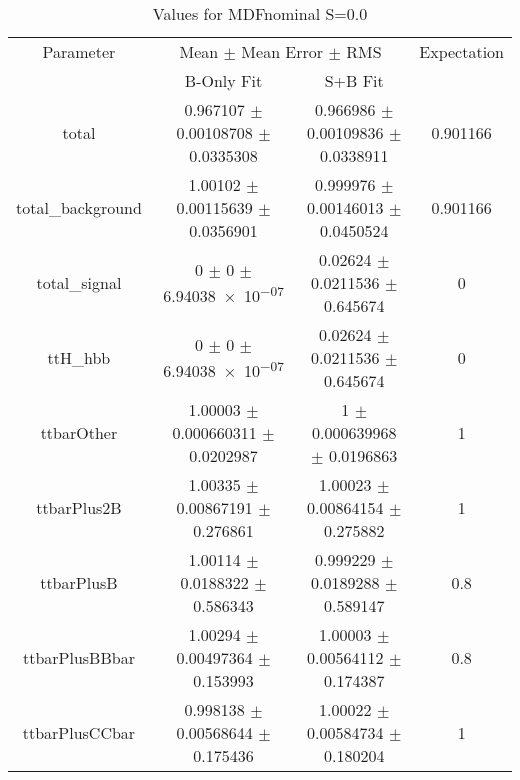 \begin{table}
\centering
\caption{Values for MDFnominal S=0.0}
\begin{tabular}{cccc}
\toprule
Parameter & \multicolumn{2}{c}{Mean $\pm$ Mean Error $\pm$ RMS} & Expectation\\
 & B-Only Fit & S+B Fit & \\
\midrule
total & \num{0.967107} $\pm$ \num{0.00108708} $\pm$ \num{0.0335308} & \num{0.966986} $\pm$ \num{0.00109836} $\pm$ \num{0.0338911} & \num{0.901166}\\
total\_background & \num{1.00102} $\pm$ \num{0.00115639} $\pm$ \num{0.0356901} & \num{0.999976} $\pm$ \num{0.00146013} $\pm$ \num{0.0450524} & \num{0.901166}\\
total\_signal & \num{0} $\pm$ \num{0} $\pm$ \num{6.94038e-07} & \num{0.02624} $\pm$ \num{0.0211536} $\pm$ \num{0.645674} & \num{0}\\
ttH\_hbb & \num{0} $\pm$ \num{0} $\pm$ \num{6.94038e-07} & \num{0.02624} $\pm$ \num{0.0211536} $\pm$ \num{0.645674} & \num{0}\\
ttbarOther & \num{1.00003} $\pm$ \num{0.000660311} $\pm$ \num{0.0202987} & \num{1} $\pm$ \num{0.000639968} $\pm$ \num{0.0196863} & \num{1}\\
ttbarPlus2B & \num{1.00335} $\pm$ \num{0.00867191} $\pm$ \num{0.276861} & \num{1.00023} $\pm$ \num{0.00864154} $\pm$ \num{0.275882} & \num{1}\\
ttbarPlusB & \num{1.00114} $\pm$ \num{0.0188322} $\pm$ \num{0.586343} & \num{0.999229} $\pm$ \num{0.0189288} $\pm$ \num{0.589147} & \num{0.8}\\
ttbarPlusBBbar & \num{1.00294} $\pm$ \num{0.00497364} $\pm$ \num{0.153993} & \num{1.00003} $\pm$ \num{0.00564112} $\pm$ \num{0.174387} & \num{0.8}\\
ttbarPlusCCbar & \num{0.998138} $\pm$ \num{0.00568644} $\pm$ \num{0.175436} & \num{1.00022} $\pm$ \num{0.00584734} $\pm$ \num{0.180204} & \num{1}\\
\bottomrule
\end{tabular}
\end{table}